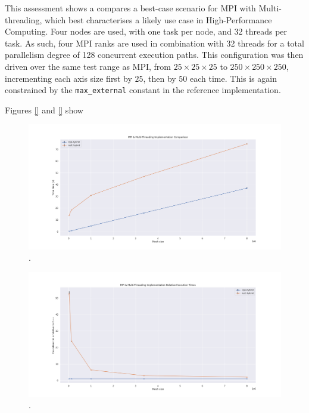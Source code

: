 This assessment shows a compares a best-case scenario for MPI with Multi-threading, which best characterises a likely use case in High-Performance Computing. Four nodes are used, with one task per node, and 32 threads per task. As such, four MPI ranks are used in combination with 32 threads for a total parallelism degree of 128 concurrent execution paths. This configuration was then driven over the same test range as MPI, from $25 \times 25 \times 25$ to $250 \times 250 \times 250$, incrementing each axis size first by $25$, then by $50$ each time. This is again constrained by the \texttt{max\_external} constant in the reference implementation.

Figures \ref{} and \ref{} show 


\begin{figure}[H]
    \centering
    \includegraphics[width=\textwidth]{images/5_performance/parallelism/12_hybrid_line.png}
    \caption{.}
    \label{fig:12_hybrid_line}
\end{figure}

\begin{figure}[H]
    \centering
    \includegraphics[width=\textwidth]{images/5_performance/parallelism/13_hybrid_line_relative.png}
    \caption{.}
    \label{fig:13_hybrid_line_relative}
\end{figure}

